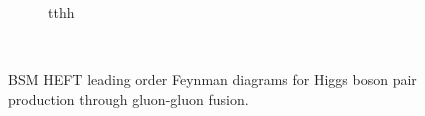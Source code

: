 \begin{figure}[tbh!]
\begin{subfigure}[t]{0.3\textwidth}
\begin{tikzpicture}
        \end{tikzpicture}
    \caption{tthh}
    \end{subfigure} \\                                                                                                                                                                                     

    \caption[Feynman diagrams, gluon-gluon fusion di-Higgs production]{BSM HEFT leading order Feynman diagrams for Higgs boson pair production through gluon-gluon fusion.}%
    \label{fig:BSM:HEFT_diagrams}
\end{figure}
